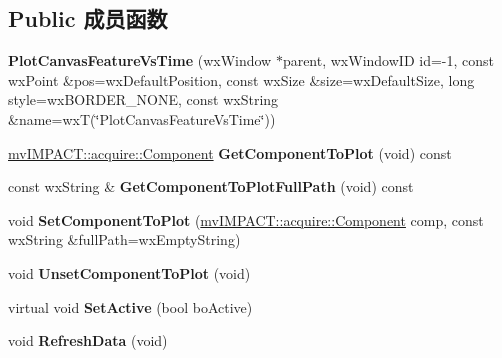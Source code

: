 \subsection*{Public 成员函数}
\begin{DoxyCompactItemize}
\item 
\hypertarget{class_plot_canvas_feature_vs_time_aacb54b4254697c22841c1af87c932cfe}{{\bfseries Plot\+Canvas\+Feature\+Vs\+Time} (wx\+Window $\ast$parent, wx\+Window\+I\+D id=-\/1, const wx\+Point \&pos=wx\+Default\+Position, const wx\+Size \&size=wx\+Default\+Size, long style=wx\+B\+O\+R\+D\+E\+R\+\_\+\+N\+O\+N\+E, const wx\+String \&name=wx\+T(\char`\"{}Plot\+Canvas\+Feature\+Vs\+Time\char`\"{}))}\label{class_plot_canvas_feature_vs_time_aacb54b4254697c22841c1af87c932cfe}

\item 
\hypertarget{class_plot_canvas_feature_vs_time_a0f033e7f43725aa7ded2521913d14fc9}{\hyperlink{classmv_i_m_p_a_c_t_1_1acquire_1_1_component}{mv\+I\+M\+P\+A\+C\+T\+::acquire\+::\+Component} {\bfseries Get\+Component\+To\+Plot} (void) const }\label{class_plot_canvas_feature_vs_time_a0f033e7f43725aa7ded2521913d14fc9}

\item 
\hypertarget{class_plot_canvas_feature_vs_time_adb2eaae6169768d0483d9a3bf533fbef}{const wx\+String \& {\bfseries Get\+Component\+To\+Plot\+Full\+Path} (void) const }\label{class_plot_canvas_feature_vs_time_adb2eaae6169768d0483d9a3bf533fbef}

\item 
\hypertarget{class_plot_canvas_feature_vs_time_a150135bc3e33d450698262493b60d6e3}{void {\bfseries Set\+Component\+To\+Plot} (\hyperlink{classmv_i_m_p_a_c_t_1_1acquire_1_1_component}{mv\+I\+M\+P\+A\+C\+T\+::acquire\+::\+Component} comp, const wx\+String \&full\+Path=wx\+Empty\+String)}\label{class_plot_canvas_feature_vs_time_a150135bc3e33d450698262493b60d6e3}

\item 
\hypertarget{class_plot_canvas_feature_vs_time_adfffacfc23988383c0ead03d6f9cdad5}{void {\bfseries Unset\+Component\+To\+Plot} (void)}\label{class_plot_canvas_feature_vs_time_adfffacfc23988383c0ead03d6f9cdad5}

\item 
\hypertarget{class_plot_canvas_feature_vs_time_ae9a5573d1e17bdecf854c85a518acddd}{virtual void {\bfseries Set\+Active} (bool bo\+Active)}\label{class_plot_canvas_feature_vs_time_ae9a5573d1e17bdecf854c85a518acddd}

\item 
\hypertarget{class_plot_canvas_feature_vs_time_aedd1683ab0b5e46c07decb72a8999896}{void {\bfseries Refresh\+Data} (void)}\label{class_plot_canvas_feature_vs_time_aedd1683ab0b5e46c07decb72a8999896}

\end{DoxyCompactItemize}
